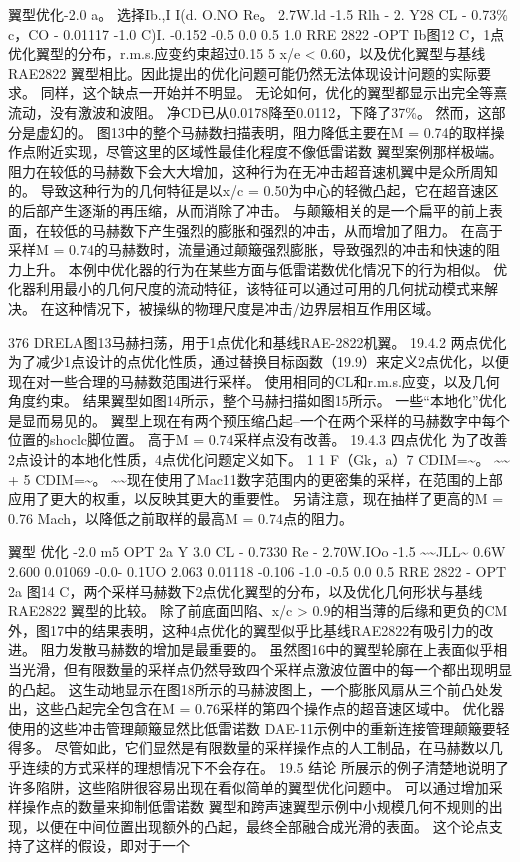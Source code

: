 \documentclass[UTF8,11pt,a4paper,openany,fontset=fandol]{ctexbook}
\begin{document}
翼型优化-2.0 a。 选择Ib.,I I(d. O.NO Re。 2.7W.ld -1.5 Rlh - 2. Y28 CL - 0.73\% c，CO - 0.01117 -1.0 C)I. -0.152 -0.5 0.0 0.5 1.0 RRE 2822 -OPT Ib图12 C，1点优化翼型的分布，r.m.s.应变约束超过0.15 5 x/e < 0.60，以及优化翼型与基线RAE2822 翼型相比。因此提出的优化问题可能仍然无法体现设计问题的实际要求。 同样，这个缺点一开始并不明显。 无论如何，优化的翼型都显示出完全等熹流动，没有激波和波阻。 净CD已从0.0178降至0.0112，下降了37\%。 然而，这部分是虚幻的。 图13中的整个马赫数扫描表明，阻力降低主要在M = 0.74的取样操作点附近实现，尽管这里的区域性最佳化程度不像低雷诺数 翼型案例那样极端。 阻力在较低的马赫数下会大大增加，这种行为在无冲击超音速机翼中是众所周知的。 导致这种行为的几何特征是以x/c = 0.50为中心的轻微凸起，它在超音速区的后部产生逐渐的再压缩，从而消除了冲击。 与颠簸相关的是一个扁平的前上表面，在较低的马赫数下产生强烈的膨胀和强烈的冲击，从而增加了阻力。 在高于采样M = 0.74的马赫数时，流量通过颠簸强烈膨胀，导致强烈的冲击和快速的阻力上升。 本例中优化器的行为在某些方面与低雷诺数优化情况下的行为相似。 优化器利用最小的几何尺度的流动特征，该特征可以通过可用的几何扰动模式来解决。 在这种情况下，被操纵的物理尺度是冲击/边界层相互作用区域。

376 DRELA图13马赫扫荡，用于1点优化和基线RAE-2822机翼。 19.4.2 两点优化 为了减少1点设计的点优化性质，通过替换目标函数（19.9）来定义2点优化，以便现在对一些合理的马赫数范围进行采样。 使用相同的CL和r.m.s.应变，以及几何角度约束。 结果翼型如图14所示，整个马赫扫描如图15所示。 一些“本地化”优化是显而易见的。 翼型上现在有两个预压缩凸起--一个在两个采样的马赫数字中每个位置的shoclc脚位置。 高于M = 0.74采样点没有改善。 19.4.3 四点优化 为了改善2点设计的本地化性质，4点优化问题定义如下。 1 1 F（Gk，a）7 CDIM=\textasciitilde{}。 \textasciitilde{}\textasciitilde{} + 5 CDIM=\textasciitilde{}。 \textasciitilde{}\textasciitilde{}现在使用了Mac11数字范围内的更密集的采样，在范围的上部应用了更大的权重，以反映其更大的重要性。 另请注意，现在抽样了更高的M = 0.76 Mach，以降低之前取样的最高M = 0.74点的阻力。

翼型 优化 -2.0 m5 OPT 2a Y 3.0 CL - 0.7330 Re - 2.70W.IOo -1.5 \textasciitilde{}\textasciitilde{}JLL\textasciitilde{} 0.6W 2.600 0.01069 -0.0- 0.1UO 2.063 0.01118 -0.106 -1.0 -0.5 0.0 0.5 RRE 2822 - OPT 2a 图14 C，两个采样马赫数下2点优化翼型的分布，以及优化几何形状与基线RAE2822 翼型的比较。 除了前底面凹陷、x/c > 0.9的相当薄的后缘和更负的CM外，图17中的结果表明，这种4点优化的翼型似乎比基线RAE2822有吸引力的改进。 阻力发散马赫数的增加是最重要的。 虽然图16中的翼型轮廓在上表面似乎相当光滑，但有限数量的采样点仍然导致四个采样点激波位置中的每一个都出现明显的凸起。 这生动地显示在图18所示的马赫波图上，一个膨胀风扇从三个前凸处发出，这些凸起完全包含在M = 0.76采样的第四个操作点的超音速区域中。 优化器使用的这些冲击管理颠簸显然比低雷诺数 DAE-11示例中的重新连接管理颠簸要轻得多。 尽管如此，它们显然是有限数量的采样操作点的人工制品，在马赫数以几乎连续的方式采样的理想情况下不会存在。 19.5 结论 所展示的例子清楚地说明了许多陷阱，这些陷阱很容易出现在看似简单的翼型优化问题中。 可以通过增加采样操作点的数量来抑制低雷诺数 翼型和跨声速翼型示例中小规模几何不规则的出现，以便在中间位置出现额外的凸起，最终全部融合成光滑的表面。 这个论点支持了这样的假设，即对于一个
\end{document}
